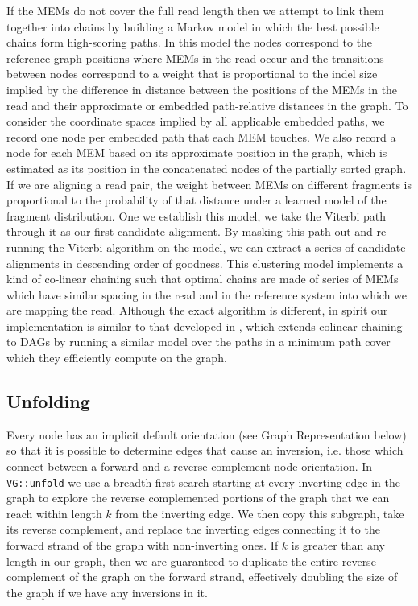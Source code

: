 If the MEMs do not cover the full read length then we attempt to link them together into chains by building a Markov model in which the best possible chains form high-scoring paths. 
In this model the nodes correspond to the reference graph positions where MEMs in the read occur and the transitions between nodes correspond to a weight that is proportional to the indel size implied by the difference in distance between the positions of the MEMs in the read and their approximate or embedded path-relative distances in the graph. 
To consider the coordinate spaces implied by all applicable embedded paths, we record one node per embedded path that each MEM touches. 
We also record a node for each MEM based on its approximate position in the graph, which is estimated as its position in the concatenated nodes of the partially sorted graph. 
If we are aligning a read pair, the weight between MEMs on different fragments is proportional to the probability of that distance under a learned model of the fragment distribution. 
One we establish this model, we take the Viterbi path through it as our first candidate alignment. 
By masking this path out and re-running the Viterbi algorithm on the model, we can extract a series of candidate alignments in descending order of goodness. 
This clustering model implements a kind of co-linear chaining such that optimal chains are made of series of MEMs which have similar spacing in the read and in the reference system into which we are mapping the read. 
Although the exact algorithm is different, in spirit our implementation is similar to that developed in \cite{kuosmanen2018using}, which extends colinear chaining to DAGs by running a similar model over the paths in a minimum path cover which they efficiently compute on the graph.

\subsection{Unfolding}

Every node has an implicit default orientation (see Graph Representation below) so that it is possible to determine edges that cause an inversion, i.e. those which connect between a forward and a reverse complement node orientation. 
In {\tt VG::unfold} we use a breadth first search starting at every inverting edge in the graph to explore the reverse complemented portions of the graph that we can reach within length $k$ from the inverting edge.
We then copy this subgraph, take its reverse complement, and replace the inverting edges connecting it to the forward strand of the graph with non-inverting ones.
If $k$ is greater than any length in our graph, then we are guaranteed to  duplicate the entire reverse complement of the graph on the forward strand, effectively doubling the size of the graph if we have any inversions in it.%

